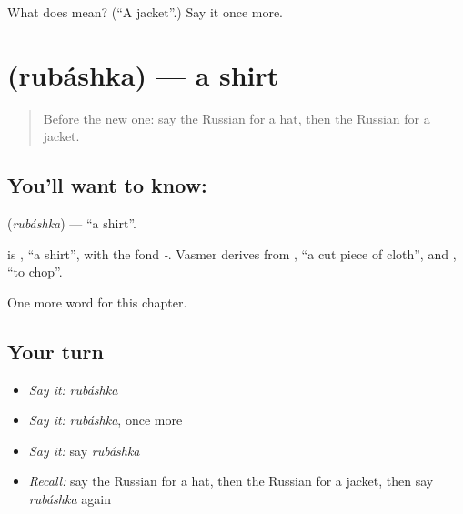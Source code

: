 \begin{tcolorbox}[breakable,colback=teal!4,colframe=teal!35!black,title={Before you move on}]
What does  mean? (\textquotedblleft{}A jacket\textquotedblright{}.) Say it once more.
\end{tcolorbox}
\section[\texorpdfstring{\ru{рубашка} (rubáshka)}{рубашка (rubáshka)}]{ (rubáshka) — a shirt}

\label{lesson:RU-C103-shirt}



\begin{quote}
Before the new one: say the Russian for a hat, then the Russian for a jacket.
\end{quote}

\subsection*{You'll want to know: }
\textbf{} (\emph{rubáshka}) — \textquotedblleft{}a shirt\textquotedblright{}.

\begin{cousinweb}
\textbf{} is \emph{}, \textquotedblleft{}a shirt\textquotedblright{}, with the fond \emph{-}. Vasmer derives \emph{} from \emph{}, \textquotedblleft{}a cut piece of cloth\textquotedblright{}, and \emph{}, \textquotedblleft{}to chop\textquotedblright{}.
\end{cousinweb}

\begin{grammarlens}[title={What you've built}]
One more word for this chapter.
\end{grammarlens}

\subsection*{Your turn}
\begin{itemize}
\raggedright
  \item \emph{Say it:} \emph{rubáshka}
  \item \emph{Say it:} \emph{rubáshka}, once more
  \item \emph{Say it:} say \emph{rubáshka}
  \item \emph{Recall:} say the Russian for a hat, then the Russian for a jacket, then say \emph{rubáshka} again
\end{itemize}


